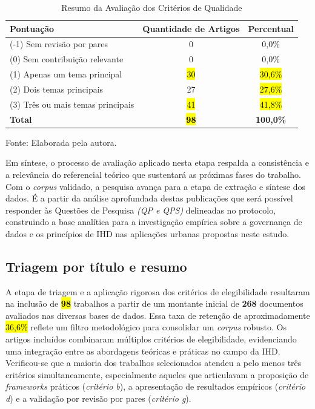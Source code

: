 \documentclass[
	12pt,				%
	oneside,			%
	a4paper,			%
	english,			%
	brazil				%
	]{abntex2ppgsi}
\begin{document}
\begin{table}[htpb]
    \centering
    \caption{Resumo da Avaliação dos Critérios de Qualidade}
    \label{tab:resumo_qualidade}
    \begin{tabular}{lcc}
        \toprule
        \textbf{Pontuação} & \textbf{Quantidade de Artigos} & \textbf{Percentual} \\
        \midrule
        (-1) Sem revisão por pares & 0 & 0,0\% \\
        (0) Sem contribuição relevante & 0 & 0,0\% \\
        (1) Apenas um tema principal & \hl{30} & \hl{30,6\%} \\
        (2) Dois temas principais & 27 & \hl{27,6\%} \\
        (3) Três ou mais temas principais & \hl{41} & \hl{41,8\%} \\
        \midrule
        \textbf{Total} & \hl{\textbf{98}} & \textbf{100,0\%} \\
        \bottomrule
    \end{tabular}
    
    \vspace{0.2cm}
    \small{Fonte: Elaborada pela autora.}
\end{table}

    Em síntese, o processo de avaliação aplicado nesta etapa respalda a consistência e a relevância do referencial teórico que sustentará as próximas fases do trabalho. Com o \textit{corpus} validado, a pesquisa avança para a etapa de extração e síntese dos dados. É a partir da análise aprofundada destas publicações que será possível responder às Questões de Pesquisa \textit{(QP e QPS)} delineadas no protocolo, construindo a base analítica para a investigação empírica sobre a governança de dados e os princípios de IHD nas aplicações urbanas propostas neste estudo.
    
 \subsection{Triagem por título e resumo}

A etapa de triagem e a aplicação rigorosa dos critérios de elegibilidade resultaram na inclusão de \hl{\textbf{98}} trabalhos a partir de um montante inicial de \textbf{268} documentos avaliados nas diversas bases de dados. Essa taxa de retenção de aproximadamente \hl{36,6\%} reflete um filtro metodológico para consolidar um \textit{corpus} robusto. Os artigos incluídos combinaram múltiplos critérios de elegibilidade, evidenciando uma integração entre as abordagens teóricas e práticas no campo da IHD. Verificou-se que a maioria dos trabalhos selecionados atendeu a pelo menos três critérios simultaneamente, especialmente aqueles que articulavam a proposição de \textit{frameworks} práticos (\textit{critério b}), a apresentação de resultados empíricos (\textit{critério d}) e a validação por revisão por pares (\textit{critério g}).
\end{document}
